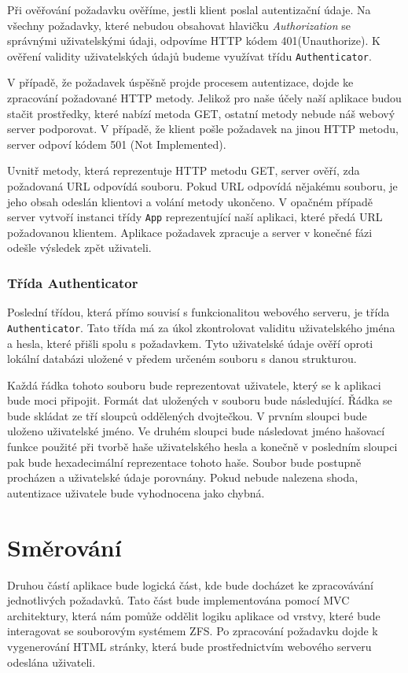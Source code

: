     Při ověřování požadavku ověříme, jestli klient poslal autentizační údaje. Na všechny požadavky, které nebudou obsahovat hlavičku \emph{Authorization} se správnými uživatelskými údaji, odpovíme HTTP kódem 401(Unauthorize).
    K ověření validity uživatelských údajů budeme využívat třídu \verb|Authenticator|.

    V případě, že požadavek úspěšně projde procesem autentizace, dojde ke zpracování požadované HTTP metody. Jelikož pro naše účely naší aplikace budou stačit prostředky, které nabízí metoda GET, ostatní metody nebude náš webový server podporovat. V případě, že klient pošle požadavek na jinou HTTP metodu, server odpoví kódem 501 (Not Implemented).

    Uvnitř metody, která reprezentuje HTTP metodu GET, server ověří, zda požadovaná URL odpovídá souboru. Pokud URL odpovídá nějakému souboru, je jeho obsah odeslán klientovi a volání metody ukončeno. V opačném případě server vytvoří instanci třídy \verb|App| reprezentující naší aplikaci, které předá URL požadovanou klientem. Aplikace požadavek zpracuje a server v konečné fázi odešle výsledek zpět uživateli.
    \subsubsection{Třída Authenticator}
    Poslední třídou, která přímo souvisí s funkcionalitou webového serveru, je třída \verb|Authenticator|. Tato třída má za úkol zkontrolovat validitu uživatelského jména a hesla, které přišli spolu s požadavkem. Tyto uživatelské údaje ověří oproti lokální databázi uložené v předem určeném souboru s danou strukturou.

    Každá řádka tohoto souboru bude reprezentovat uživatele, který se k aplikaci bude moci připojit. Formát dat uložených v souboru bude následující. Řádka se bude skládat ze tří sloupců oddělených dvojtečkou. V prvním sloupci bude uloženo uživatelské jméno. Ve druhém sloupci bude následovat jméno hašovací funkce použité při tvorbě haše uživatelského hesla a konečně v posledním sloupci pak bude hexadecimální reprezentace tohoto haše. Soubor bude postupně procházen a uživatelské údaje porovnány. Pokud nebude nalezena shoda, autentizace uživatele bude vyhodnocena jako chybná.
\section{Směrování}
\label{route}
Druhou částí aplikace bude logická část, kde bude docházet ke zpracovávání jednotlivých požadavků. Tato část bude implementována pomocí MVC architektury, která nám pomůže oddělit logiku aplikace od vrstvy, které bude interagovat se souborovým systémem ZFS. Po zpracování požadavku dojde k vygenerování HTML stránky, která bude prostřednictvím webového serveru odeslána uživateli.

